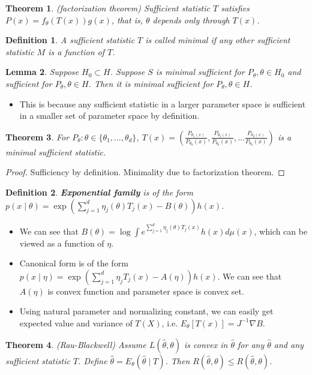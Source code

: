 \documentclass[11pt,reqno]{amsart}
\newtheorem{theorem}{Theorem}
\newtheorem{lemma}[theorem]{Lemma}
\newtheorem{definition}{Definition}
\theoremstyle{remark}
\begin{document}
\begin{theorem}(factorization theorem)
Sufficient statistic $T$ satisfies $P(x)=f_\theta(T(x))g(x)$, that is, $\theta$ depends only through $T(x)$.
\end{theorem}
\begin{definition}
A sufficient statistic $T$ is called minimal if any other sufficient statistic $M$ is a function of $T$.
\end{definition}
\begin{lemma}
Suppose $H_0\subset H$. Suppose $S$ is minimal sufficient for $P_\theta,\theta\in H_0$ and sufficient for $P_\theta,\theta\in H$. Then 
it is minimal sufficient for $P_\theta,\theta\in H$.
\end{lemma} 
\begin{itemize}
\item This is because any sufficient statistic in a larger parameter space is 
sufficient in a smaller set  of parameter space by definition.
\end{itemize}
\begin{theorem}
For $P_\theta:\theta\in\{\theta_1,\dots,\theta_d\}$, $T(x)=(\frac{P_{\theta_1(x)}}{P_{\theta_0}(x)}, 
\frac{P_{\theta_2(x)}}{P_{\theta_0}(x)},\dots \frac{P_{\theta_d(x)}}{P_{\theta_0}(x)})$ is a minimal sufficient statistic.
\end{theorem}
\begin{proof}
Sufficiency by definition. Minimality due to factorization theorem.
\end{proof}
\begin{definition}
\textbf{Exponential family} is of the form $p(x\mid \theta)=\exp(\sum\limits^d_{j=1}\eta_j(\theta)T_j(x)-B(\theta))h(x)$. 
\end{definition}
\begin{itemize}
\item We can see that $B(\theta)=\log\int e^{\sum^d_{j=1}\eta_j(\theta)T_j(x)}h(x)d\mu(x)$, which can be viewed as a function of $\eta$.
\item Canonical form is of the form $p(x\mid \eta)=\exp(\sum^d_{j=1}\eta_jT_j(x)-A(\eta))h(x)$.
 We can see that $A(\eta)$ is convex function and parameter space is convex set.
\item Using natural parameter and normalizing constant, we can easily get expected value and variance of $T(X)$, i.e. 
$E_\theta[T(x)]=J^{-1}\nabla B$.
\end{itemize}
\begin{theorem}(Rau-Blackwell)
Assume $L(\hat\theta,\theta)$ is convex in $\hat\theta$ for any $\hat\theta$ and any sufficient statistic $T$. Define
$\hat\theta=E_\theta(\hat\theta\mid T)$. Then $R(\hat\theta,\theta)\leq R(\hat\theta,\theta)$.
\end{theorem}
\end{document}
